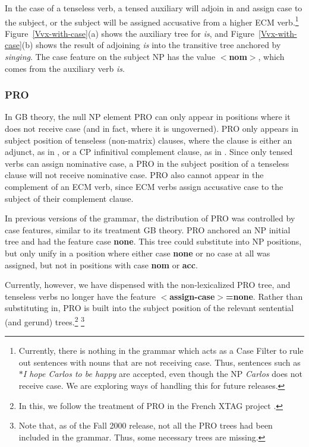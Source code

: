 In the case of a tenseless verb, a tensed auxiliary will adjoin in and assign
case to the subject, or the subject will be assigned accusative from a higher
ECM verb.\footnote{Currently, there is nothing in the grammar which acts as a
Case Filter to rule out sentences with nouns that are not receiving
case. Thus, sentences such as {\it $\ast$I hope Carlos to be happy} are
accepted, even though the NP {\it Carlos} does not receive case. We are
exploring ways of handling this for future releases.}
Figure~\ref{Vvx-with-case}(a) shows the auxiliary tree for {\it is}, and
Figure~\ref{Vvx-with-case}(b) shows the result of adjoining {\it is} into the
transitive tree anchored by {\it singing}. The case feature on the subject NP
has the value {\bf $<$nom$>$}, which comes from the auxiliary verb {\it is}. 

\subsubsection{PRO}

In GB theory, the null NP element PRO can only appear in positions where it
does not receive case (and in fact, where it is ungoverned). PRO only appears
in subject position of tenseless (non-matrix) clauses, where the clause is
either an adjunct, as in , or a CP infinitival complement clause, as in
. Since only tensed verbs can assign nominative case, a PRO in the
subject position of a tenseless clause will not receive nominative case. PRO
also cannot appear in the complement of an ECM verb, since ECM verbs assign
accusative case to the subject of their complement clause.


In previous versions of the grammar, the distribution of PRO was controlled by
case features, similar to its treatment GB theory. PRO anchored an NP initial
tree and had the feature case {\bf none}. This tree could substitute into NP
positions, but only unify in a position where either case {\bf none} or no case
at all was assigned, but not in positions with case {\bf nom} or {\bf acc}.

Currently, however, we have dispensed with the non-lexicalized PRO tree, and
tenseless verbs no longer have the 
feature {\bf $<$assign-case$>$=none}. Rather than substituting in, PRO
is built into the subject position of the relevant sentential (and gerund)
trees.\footnote{In this, we follow the treatment of PRO in the French XTAG
project \cite{ACK00}.} \footnote{Note that, as of the Fall 2000 release, not
all the PRO trees had been included in the grammar. Thus, some necessary trees
are missing.}

